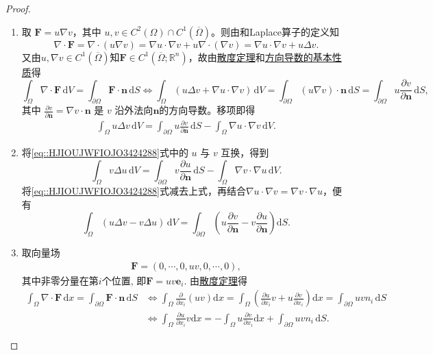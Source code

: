 \documentclass[../../main.tex]{subfiles}%
\begin{document}
\begin{proof}
\begin{enumerate}[(1)]
\item 取 $\bm{F} = u \nabla v$，其中 $u, v \in C^2(\Omega) \cap C^1(\overline{\Omega})$。则由和Laplace算子的定义知
\[
\nabla \cdot \bm{F} = \nabla \cdot (u \nabla v) = \nabla u \cdot \nabla v + u \nabla \cdot (\nabla v) = \nabla u \cdot \nabla v + u \Delta v.
\]
又由$u, \nabla v \in C^1(\overline{\Omega})$知$\bm{F} \in C^1(\overline{\Omega};\mathbb{R}^n)$，故由\hyperref[theorem:Gauss-Green公式(散度定理)]{散度定理}和\hyperref[theorem:方向导数的基本性质-1]{方向导数的基本性质}得
\[
\int_{\Omega}\nabla\cdot\bm{F}\,\mathrm{d}V=\int_{\partial\Omega}\bm{F}\cdot\bm{n}\,\mathrm{d}S \iff \int_{\Omega} (u \Delta v + \nabla u \cdot \nabla v) \, \mathrm{d}V = \int_{\partial\Omega} (u \nabla v) \cdot \bm{n} \, \mathrm{d}S = \int_{\partial\Omega} u \frac{\partial v}{\partial \bm{n}} \, \mathrm{d}S,
\]
其中 $\frac{\partial v}{\partial \bm{n}} = \nabla v \cdot \bm{n}$ 是 $v$ 沿外法向$\bm{n}$的方向导数。移项即得
\begin{align}\label{eq::HJIOUJWFIOJO3424288}
\int_{\Omega} u \Delta v \, \mathrm{d}V = \int_{\partial\Omega} u \frac{\partial v}{\partial \bm{n}} \, \mathrm{d}S - \int_{\Omega} \nabla u \cdot \nabla v \, \mathrm{d}V.
\end{align}

\item 将\eqref{eq::HJIOUJWFIOJO3424288}式中的 $u$ 与 $v$ 互换，得到
\[
\int_{\Omega} v \Delta u \, \mathrm{d}V = \int_{\partial\Omega} v \frac{\partial u}{\partial \bm{n}} \, \mathrm{d}S - \int_{\Omega} \nabla v \cdot \nabla u \, \mathrm{d}V.
\]
将\eqref{eq::HJIOUJWFIOJO3424288}式减去上式，再结合$\nabla u \cdot \nabla v = \nabla v \cdot \nabla u$，便有
\[
\int_{\Omega} (u \Delta v - v \Delta u) \, \mathrm{d}V = \int_{\partial\Omega} \left( u \frac{\partial v}{\partial \bm{n}} - v \frac{\partial u}{\partial \bm{n}} \right) \mathrm{d}S.
\]

\item 取向量场
\begin{align*}
\bm{F}=\left( 0,\cdots, 0, uv, 0, \cdots, 0 \right),
\end{align*}
其中非零分量在第$i$个位置, 即$\bm{F}=uv\bm{e}_i$. 由\hyperref[theorem:Gauss-Green公式(散度定理)]{散度定理}得
\begin{align*}
\int_{\Omega}{\nabla \cdot \mathbf{F}\,\mathrm{d}x}=\int_{\partial \Omega}{\mathbf{F}\cdot \mathbf{n}\,\mathrm{d}S}&\Longleftrightarrow \int_{\Omega}{\frac{\partial}{\partial x_i}\left( uv \right) \mathrm{d}x}=\int_{\Omega}{\left( \frac{\partial u}{\partial x_i}v+u\frac{\partial v}{\partial x_i} \right) \mathrm{d}x}=\int_{\partial \Omega}{uvn_i\,\mathrm{d}S}
\\
&\Longleftrightarrow \int_{\Omega}{\frac{\partial u}{\partial x_i}v\mathrm{d}x}=-\int_{\Omega}{u\frac{\partial v}{\partial x_i}\mathrm{d}x}+\int_{\partial \Omega}{uvn_i\,\mathrm{d}S}.
\end{align*}
\end{enumerate}
\end{proof}
\end{document}
